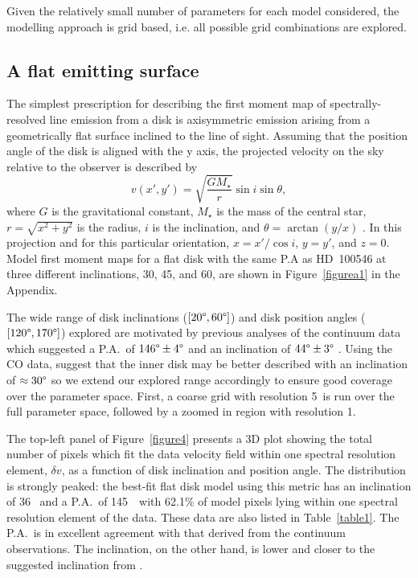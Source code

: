 \documentclass[onecolumn]{aastex6}
\begin{document}
Given the relatively small number of parameters for each model considered,
the modelling approach is grid based,
i.e. all possible grid combinations are explored.

\subsection{A flat emitting surface}

The simplest prescription for describing the first moment map of spectrally-resolved
line emission from a disk
is axisymmetric emission arising from a geometrically flat surface inclined to the line of sight.
Assuming that the position angle of the disk is aligned with the
y axis, the projected velocity on the sky relative to the observer is described by
\begin{equation}
v(x',y') = \sqrt{\frac{G M_\star}{r}} \sin i \sin \theta,
\label{velocity}
\end{equation}
where $G$ is the gravitational constant, $M_\star$ is the mass of the central
star, $r=\sqrt{x^2+y^2}$ is the radius, $i$ is the inclination, and
$\theta = \arctan(y/x)$ \citep[e.g.,][]{rosenfeld13}.
In this projection and for this particular orientation,
$x = x'/\cos i$, $y = y'$, and $z = 0$.
Model first moment maps for a flat disk with the same P.A as
HD~100546 at three different inclinations, 30\degree, 45\degree, and
60\degree, are shown in Figure~\ref{figurea1} in the Appendix.

The wide range of disk inclinations ($[20\degree,60\degree]$) and disk
position angles ($[120\degree,170\degree]$) explored are motivated by previous analyses
of the continuum data which suggested a P.A.~of $146\degree \pm 4\degree$
and an inclination of $44\degree \pm 3\degree$ \citep[see Paper I and][]{pineda14}.
Using the CO data, \citet{pineda14} suggest that the inner disk may be better described
with an inclination of $\approx 30\degree$ so we extend our explored range
accordingly to ensure good coverage over the parameter space.
First, a coarse grid with resolution 5\degree~is run over the full parameter space,
followed by a zoomed in region with resolution 1\degree.

The top-left panel of Figure~\ref{figure4} presents a 3D plot showing the
total number of pixels which fit the data velocity field within one spectral resolution
element, $\delta v$, as a function of disk inclination and position angle.
The distribution is strongly peaked: the best-fit flat disk model using this
metric has an inclination of 36\degree~ and a P.A.~of 145~\degree~with 62.1\% of model pixels
lying within one spectral resolution element of the data.
These data are also listed in Table~\ref{table1}.
The P.A.~is in excellent agreement with that derived from the continuum observations.
The inclination, on the other hand, is lower and closer
to the suggested inclination from \citet{pineda14}.
\end{document}
